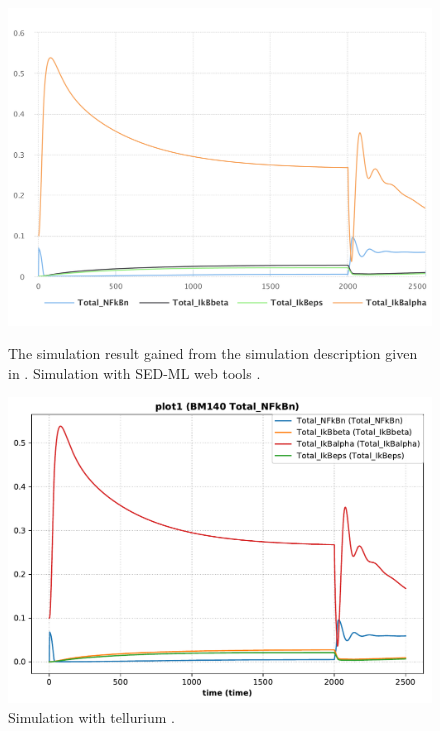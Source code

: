 \begin{figure}[ht]
    \centering
    \begin{minipage}{0.47\textwidth}
        \centering
        \includegraphics[width=1.0\textwidth]{examples/ikappab/results/sedml_webtools/plot1}
        \caption{The simulation result gained from the simulation description given in . Simulation with SED-ML web tools \citep{bergmann2017sed}.}
        \label{fig:ikappab1}
    \end{minipage}\hfill
    \begin{minipage}{0.47\textwidth}
        \centering
        \includegraphics[width=1.0\textwidth]{examples/ikappab/results/tellurium/plot1}
        \caption{Simulation with tellurium \citep{tellurium}.}
        \label{fig:ikappab2}
    \end{minipage}
\end{figure}

